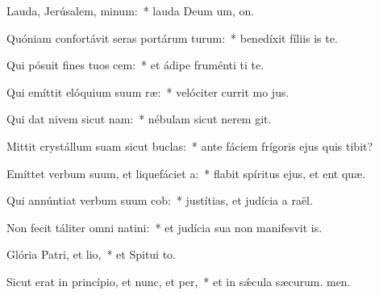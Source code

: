 \item Lauda, Jerúsalem, minum:~* lauda Deum um, on.
\item Quóniam confortávit seras portárum turum:~* benedíxit fíliis is  te.
\item Qui pósuit fines tuos cem:~* et ádipe fruménti ti te.
\item Qui emíttit elóquium suum ræ:~* velóciter currit mo jus.
\item Qui dat nivem sicut nam:~* nébulam sicut nerem git.
\item Mittit crystállum suam sicut buclas:~* ante fáciem frígoris ejus quis tibit?
\item Emíttet verbum suum, et liquefáciet a:~* flabit spíritus ejus, et ent quæ.
\item Qui annúntiat verbum suum cob:~* justítias, et judícia a raël.
\item Non fecit táliter omni natini:~* et judícia sua non manifesvit is.
\item Glória Patri, et lio,~* et Spitui to.
\item Sicut erat in princípio, et nunc, et per,~* et in sǽcula sæcurum. men.
